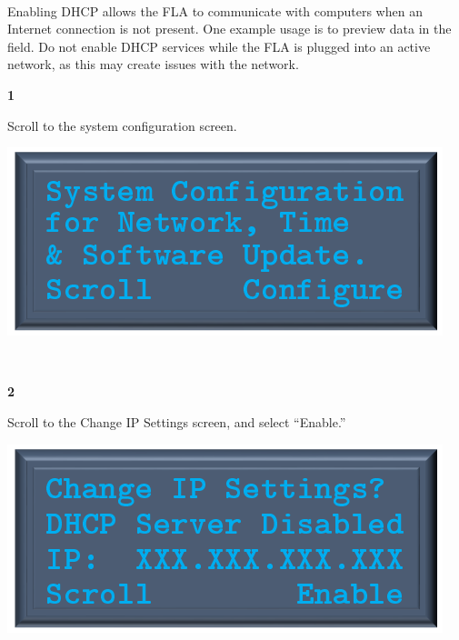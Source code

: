 \documentclass[11pt, oneside]{book}
\begin{document}
\paragraph{  }
Enabling DHCP allows the FLA to communicate with computers when an Internet connection is not present.
One example usage is to preview data in the field. Do not enable DHCP services while the FLA is plugged into an active network, as this may
create issues with the network.
\\[\baselineskip]
\noindent\begin{minipage}{0.45\textwidth}%
\begin{center}
\textbf{1}\\[\baselineskip]
\end{center}
Scroll to the system configuration screen.
\end{minipage}%
\hfill%
\begin{minipage}{0.45\textwidth}
\includegraphics[width=\linewidth]{../media/pstricks_files/06_system_configuration}
\end{minipage}
\\[\baselineskip]
\noindent\begin{minipage}{0.45\textwidth}%
\begin{center}
\textbf{2}\\[\baselineskip]
\end{center}
Scroll to the Change IP Settings screen, and select ``Enable.''
\end{minipage}%
\hfill%
\begin{minipage}{0.45\textwidth}
\includegraphics[width=\linewidth]{../media/pstricks_files/08_change_ip_settings}
\end{minipage}
\end{document}
